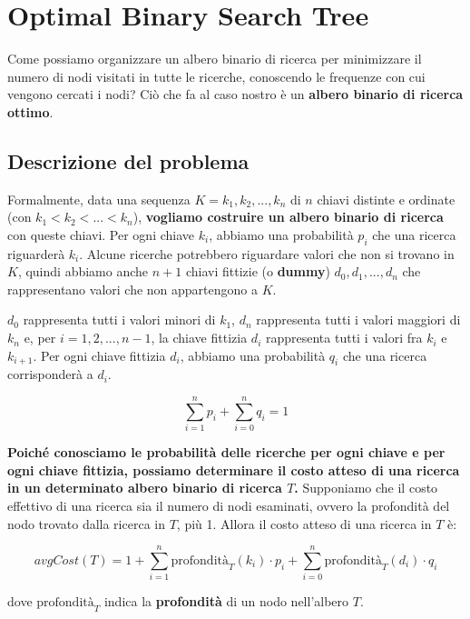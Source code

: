 \chapter{Optimal Binary Search Tree}

Come possiamo organizzare un albero binario di ricerca per minimizzare
il numero di nodi visitati in tutte le ricerche, conoscendo le frequenze
con cui vengono cercati i nodi? Ciò che fa al caso nostro è un
\textbf{albero binario di ricerca ottimo}.

\section{Descrizione del problema}

\begin{myblockquote}
  Formalmente, data una sequenza $K = k_1, k_2, ..., k_n$ di $n$
  chiavi distinte e ordinate (con $k_1 < k_2 < ... < k_n$),
  \textbf{vogliamo costruire un albero binario di ricerca} con queste
  chiavi. Per ogni chiave $k_i$, abbiamo una probabilità $p_i$ che una
  ricerca riguarderà $k_i$. Alcune ricerche potrebbero riguardare valori
  che non si trovano in $K$, quindi abbiamo anche $n+1$ chiavi
  fittizie (o \textbf{dummy}) $d_0, d_1, ..., d_n$ che rappresentano
  valori che non appartengono a $K$.
\end{myblockquote}

$d_0$ rappresenta tutti i valori minori di $k_1$, $d_n$
rappresenta tutti i valori maggiori di $k_n$ e, per
$i = 1, 2, ..., n-1$, la chiave fittizia $d_i$ rappresenta tutti i
valori fra $k_i$ e $k_{i+1}$. Per ogni chiave fittizia $d_i$,
abbiamo una probabilità $q_i$ che una ricerca corrisponderà a $d_i$.

$$
  \sum_{i=1}^{n} p_i +  \sum_{i=0}^{n} q_i = 1
$$

\textbf{Poiché conosciamo le probabilità delle ricerche per ogni chiave
  e per ogni chiave fittizia, possiamo determinare il costo atteso di una
  ricerca in un determinato albero binario di ricerca $T$.} Supponiamo
che il costo effettivo di una ricerca sia il numero di nodi esaminati,
ovvero la profondità del nodo trovato dalla ricerca in $T$, più 1.
Allora il costo atteso di una ricerca in $T$ è:

$$
  avgCost(T) = 1 + \sum_{i=1}^{n} \text{profondità}_T (k_i) \cdot p_i + \sum_{i = 0}^{n} \text{profondità}_T (d_i) \cdot q_i
$$

dove $\text{profondità}_T$ indica la \textbf{profondità} di un nodo
nell'albero $T$.



